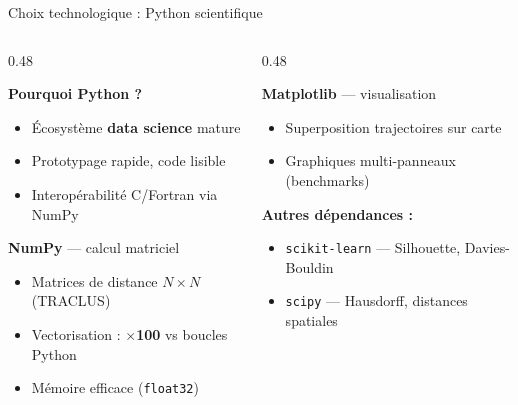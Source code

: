 \documentclass[aspectratio=169, 11pt]{beamer}
\begin{document}
\begin{frame}{Choix technologique : Python scientifique}
\small
\begin{columns}[T]
\begin{column}{0.48\textwidth}

    \textbf{Pourquoi Python ?}
    \begin{itemize}\setlength{\itemsep}{1pt}
        \item Écosystème \textbf{data science} mature
        \item Prototypage rapide, code lisible
        \item Interopérabilité C/Fortran via NumPy
    \end{itemize}

    \vspace{0.15cm}
    \textbf{NumPy} — calcul matriciel
    \begin{itemize}\setlength{\itemsep}{1pt}
        \item Matrices de distance $N \times N$ (TRACLUS)
        \item Vectorisation : \textcolor{dota_green}{\textbf{$\times$100}} vs boucles Python
        \item Mémoire efficace (\texttt{float32})
    \end{itemize}

\end{column}
\begin{column}{0.48\textwidth}

    \textbf{Matplotlib} — visualisation
    \begin{itemize}\setlength{\itemsep}{1pt}
        \item Superposition trajectoires sur carte
        \item Graphiques multi-panneaux (benchmarks)
    \end{itemize}

    \vspace{0.15cm}
    \textbf{Autres dépendances :}
    \begin{itemize}\setlength{\itemsep}{1pt}
        \item \texttt{scikit-learn} — Silhouette, Davies-Bouldin
        \item \texttt{scipy} — Hausdorff, distances spatiales
    \end{itemize}

    

\end{column}
\end{columns}

\end{frame}
\end{document}
